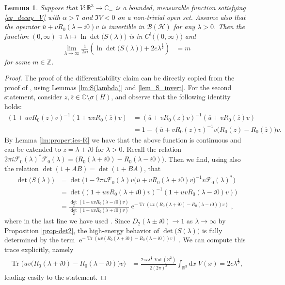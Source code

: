 \documentclass{article}
\def\B{\mathscr B}
\def\C{\mathbb C}
\def\d{\mathrm{d}}
\def\F{\mathscr F}
\def\H{\mathcal H}
\def\R{\mathbb R}
\def\S{\mathbb S}
\def\Z{\mathbb Z}
\def\e{\mathop{\mathrm{e}}\nolimits}
\def\Tr{\mathop{\mathrm{Tr}}\nolimits}
\def\vol{\mathop{\mathrm{Vol}}\nolimits}
\newtheorem{Lemma}[Theorem]{Lemma}
\begin{document}
\begin{Lemma}\label{lem:high-energy-limit}
Suppose that $V:\R^3\to \C_-$ is a bounded, measurable function satisfying \eqref{eq_decay_V} with $\alpha>7$ and $\Im V<0$ on a non-trivial open set.
Assume also that the operator $\overline{u} + vR_0(\lambda-i0)v$
is invertible in $\B(\H)$ for any $\lambda > 0$.
Then the function $(0,\infty) \ni \lambda \mapsto  \ln \det\big(S(\lambda)\big)$ is in $C^1\big((0,\infty)\big)$ and 
\begin{align}\label{eq:high-energy-limit}
\lim_{\lambda \to \infty} \frac{1}{2\pi i}\left( \ln \det\big(S(\lambda)\big) + 2 c \lambda^\frac12 \right) &= m
\end{align}
for some $m \in \Z$.
\end{Lemma}

\begin{proof}
The proof of  the differentiability claim can be directly copied from the proof of \cite[Thm.~9.1.18]{Yaf10}, using Lemmas \ref{lm:S(lambda)} and \ref{lem_S_invert}.
For the second statement, consider $z, \overline{z} \in \C \setminus \sigma(H)$, 
and observe that the following identity holds:
\begin{align*}
(1+uvR_0(z)v)^{-1}(1+uvR_0(\overline{z})v)  &=(\overline{u}+vR_0(z)v)^{-1}(\overline{u}+vR_0(\overline{z})v) \\ 
&= 1- (\overline{u}+vR_0(z)v)^{-1} v \big(R_0(z)-R_0(\overline{z})\big)v.
\end{align*}
By Lemma \ref{lm:properties-R} we have that the above function is continuous and can be extended to $z = \lambda \pm i0$ for $\lambda > 0$. Recall the relation $2\pi i \F_0(\lambda)^*\F_0(\lambda) =  \big(R_0(\lambda+i0)-R_0(\lambda-i0)\big)$. Then we find, using also the relation $\det(1+AB) = \det(1+BA)$, that 
\begin{align*}
\det\big(S(\lambda)\big) &= \det\big(1-2\pi i \F_0(\lambda) v \big(\overline{u}+vR_0(\lambda+i0)v\big)^{-1} v \F_0(\lambda)^*\big) \\
&= \det\big((1+uvR_0(\lambda+i0)v)^{-1}(1+uvR_0(\lambda-i0)v)\big) \\
&= \frac{\det_2(1+uvR_0(\lambda-i0)v)}{\det_2(1+uvR_0(\lambda+i0)v)} \e^{-\Tr(uv(R_0(\lambda+i0)-R_0(\lambda-i0))v)},
\end{align*}
where in the last line we have used \cite[Lem.~III.4]{guillope-thesis}. Since $D_2(\lambda \pm i0) \to 1$ as $\lambda \to \infty$ by Proposition \ref{prop-det2}, the high-energy behavior of $\det\big(S(\lambda)\big)$ is fully determined by the term $\e^{-\Tr(uv(R_0(\lambda+i0)-R_0(\lambda-i0))v)}$. We can compute this trace explicitly, namely
\begin{align}\label{eq:trace-computation}
\Tr\Big(uv\big(R_0(\lambda+i0)-R_0(\lambda-i0)\big)v\Big) &= \frac{2\pi i \lambda^{\frac12} \vol(\S^2)}{2(2\pi)^3} \int_{\R^3}\d x\;\! V(x)  = 2 c \lambda^\frac12,
\end{align}
leading easily to the statement.
\end{proof}
\end{document}
